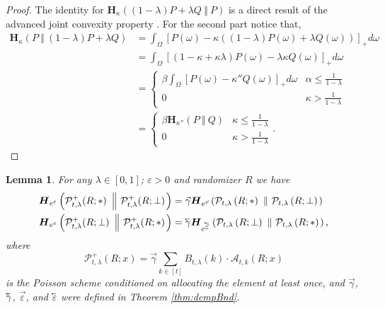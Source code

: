 \documentclass{article}
\theoremstyle{plain}
\newtheorem{lemma}[theorem]{Lemma}
\theoremstyle{definition}
\newcommand{\eps}{\varepsilon}
\newcommand{\lvec}[1]{\reflectbox{$\vec{\reflectbox{$#1$}}$}}
\newcommand{\rand}{R}
\newcommand{\HockeyStick}[1]{\boldsymbol{H}_{#1}}
\newcommand{\HockeyStickDiv}[3]{\HockeyStick{#1}\left(#2 ~\left\Vert~ #3 \right. \right)}
\newcommand{\PoisFunc}[3]{\mathcal{P}_{#1}\left(#2; #3\right)}
\newcommand{\allocFunc}[3]{\mathcal{A}_{#1}\left(#2; #3\right)}
\newcommand{\add}[1]{\lvec{#1}}
\newcommand{\rem}[1]{\vec{#1}}
\begin{document}
\begin{proof}
    The identity for $\HockeyStickDiv{\kappa}{(1-\lambda)P + \lambda Q}{P}$ is a direct result of the advanced joint convexity property \citep[Theorem 2]{BBG18}. For the second part notice that,
    \begin{align*}
        \HockeyStickDiv{\kappa}{P}{(1-\lambda)P + \lambda Q} & = \int_{\Omega} \left[P(\omega) - \kappa \left((1-\lambda)P(\omega)+ \lambda Q(\omega) \right)\right]_{+} d \omega
        \\ & = \int_{\Omega} \left[(1 - \kappa + \kappa \lambda)P(\omega) -  \lambda \kappa Q(\omega) \right]_{+} d \omega
        \\ & = \begin{cases}
            \beta \int_{\Omega} \left[P(\omega) - \kappa'' Q(\omega) \right]_{+} d \omega & \alpha \le \frac{1}{1-\lambda}
            \\ 0 & \kappa > \frac{1}{1-\lambda}
        \end{cases}
        \\ & = \begin{cases}
            \beta \HockeyStickDiv{\kappa''}{P}{Q} & \kappa \le \frac{1}{1-\lambda}
            \\ 0 & \kappa > \frac{1}{1-\lambda}
        \end{cases}.
    \end{align*}
\end{proof}

\begin{lemma}\label{lem:PoisUpper}
    For any $\lambda \in [0, 1]$; $\eps > 0$ and randomizer $\rand$ we have
    \begin{align*}
        \HockeyStickDiv{e^{\eps}}{\mathcal{P}_{t, \lambda}^{+}(\rand; *)}{\mathcal{P}_{t, \lambda}^{+}(\rand; \bot)} & = \rem{\gamma} \HockeyStickDiv{e^{\rem{\eps}}}{\PoisFunc{t, \lambda}{\rand}{*}}{\PoisFunc{t, \lambda}{\rand}{\bot}}
        \\ \HockeyStickDiv{e^{\eps}}{\mathcal{P}_{t, \lambda}^{+}(\rand; \bot)}{\mathcal{P}_{t, \lambda}^{+}(\rand; *)} & = \add{\gamma} \HockeyStickDiv{e^{\add{\eps}}}{\PoisFunc{t, \lambda}{\rand}{\bot}}{\PoisFunc{t, \lambda}{\rand}{*}},
    \end{align*}
    where 
    \[
        \mathcal{P}_{t, \lambda}^{+}(\rand; x) = \rem{\gamma} \sum_{k \in [t]} B_{t, \lambda}(k) \cdot \allocFunc{t, k}{\rand}{x}
    \]
    is the Poisson scheme conditioned on allocating the element at least once, and $\rem{\gamma}$, $\add{\gamma}$, $\rem{\eps}$, and $\add{\eps}$ were defined in Theorem \ref{thm:dcmpBnd}.
\end{lemma}
\end{document}
